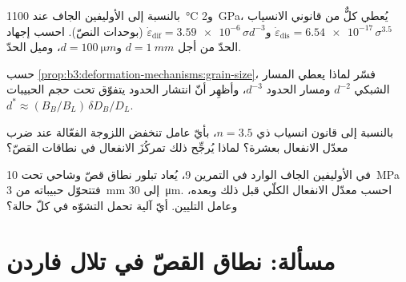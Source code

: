 \begin{exercise}[$\star\star$]\label{exo:b3:deformation-mechanisms:9}
بالنسبة إلى الأوليفين الجاف عند \qty{1100}{\celsius} و\qty{2}{GPa}، يُعطي كلٌّ من قانوني الانسياب
$\dot\varepsilon_{\mathrm{dis}} = \num{6.54e-17}\,\sigma^{3.5}$
و$\dot\varepsilon_{\mathrm{dif}} = \num{3.59e-6}\,\sigma d^{-3}$ (بوحدات النصّ). احسب إجهاد الحدّ
من أجل $d = \qty{1}{mm}$ و$d =
\qty{100}{\micro m}$، وميل الحدّ.
\end{exercise}

\begin{exercise}[$\star\star\star$]\label{exo:b3:deformation-mechanisms:10}
حسب \cref{prop:b3:deformation-mechanisms:grain-size}،
فسّر لماذا يعطي المسار الشبكي $d^{-2}$ ومسار الحدود $d^{-3}$، وأظهِر
أنّ انتشار الحدود يتفوّق تحت حجم الحبيبات $d^* \approx
(B_B/B_L)\,\delta D_B/D_L$.
\end{exercise}

\begin{exercise}[$\star\star\star$]\label{exo:b3:deformation-mechanisms:11}
بالنسبة إلى قانون انسياب ذي $n = 3.5$، بأيّ عامل تنخفض اللزوجة الفعّالة
عند ضرب معدّل الانفعال بعشرة؟ لماذا يُرجِّح ذلك
تمركُزَ الانفعال في نطاقات القصّ؟
\end{exercise}

\begin{exercise}[$\star\star\star$]\label{exo:b3:deformation-mechanisms:12}
في الأوليفين الجاف الوارد في التمرين 9، يُعاد تبلور نطاق قصّ وشاحي تحت \qty{10}{MPa}
فتتحوّل حبيباته من \qty{3}{mm} إلى \qty{30}{\micro m}. احسب معدّل الانفعال الكلّي
قبل ذلك وبعده، وعامل التليين. أيّ آلية
تحمل التشوّه في كلّ حالة؟
\end{exercise}

\section{مسألة: نطاق القصّ في تلال فاردن}

